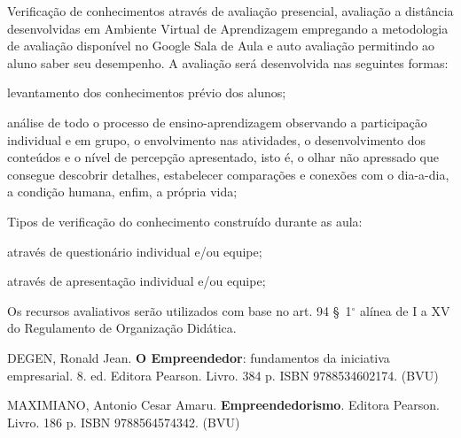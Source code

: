 \begin{pud}
	\avaliacao
	Verificação de conhecimentos através de avaliação presencial, avaliação a distância desenvolvidas em Ambiente Virtual de Aprendizagem empregando a metodologia de avaliação disponível no Google Sala de Aula e auto avaliação permitindo ao aluno saber seu desempenho.
	A avaliação será desenvolvida nas seguintes formas:
		\begin{description}[itemsep=0em]
            \item[$\bullet$ Diagnóstica --] levantamento dos conhecimentos prévio dos alunos;
            \item[$\bullet$ Continuada --] análise de todo o processo de ensino-aprendizagem observando a participação individual e em grupo, o envolvimento nas atividades, o desenvolvimento dos conteúdos e o nível de percepção apresentado, isto é, o olhar não apressado que consegue descobrir detalhes, estabelecer comparações e conexões com o dia-a-dia, a condição humana, enfim, a própria vida;            
        \end{description}
        
        Tipos de verificação do conhecimento construído durante as aula: 
	    \begin{description}[itemsep=0em]
            \item[$\bullet$ Escrita,] através de questionário individual e/ou equipe;
            \item[$\bullet$ Oral,] através de apresentação individual e/ou equipe;
            
        \end{description}
		Os recursos avaliativos serão utilizados com base  no art. 94 \S~1$^\circ$ alínea de I a XV do Regulamento de Organização Didática.

	\begin{bibbasica}
		\item DEGEN, Ronald Jean. \textbf{O Empreendedor}: fundamentos da iniciativa empresarial. 8. ed. Editora Pearson. Livro. 384 p. ISBN 9788534602174.  (BVU) %
        
		\item MAXIMIANO, Antonio Cesar Amaru. \textbf{Empreendedorismo}. Editora Pearson. Livro. 186 p. ISBN 9788564574342. (BVU)
		

\end{bibbasica}
\end{pud}
